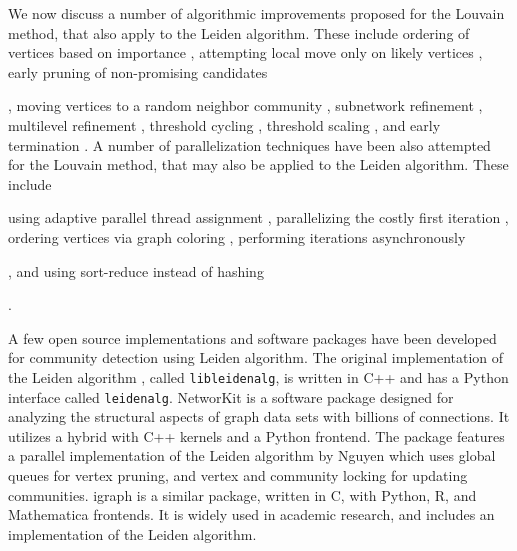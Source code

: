 We now discuss a number of algorithmic improvements proposed for the Louvain method, that also apply to the Leiden algorithm. These include ordering of vertices based on importance \cite{com-aldabobi22}, attempting local move only on likely vertices \cite{com-ryu16, com-ozaki16, com-zhang21, com-shi21}, early pruning of non-promising candidates \cite{com-ryu16, com-halappanavar17, com-zhang21, com-you22}, moving vertices to a random neighbor community \cite{com-traag15}, subnetwork refinement \cite{com-waltman13, com-traag19}, multilevel refinement \cite{com-rotta11, com-gach14, com-shi21}, threshold cycling \cite{com-ghosh18}, threshold scaling \cite{com-lu15, com-naim17, com-halappanavar17}, and early termination \cite{com-ghosh18}. A number of parallelization techniques have been also attempted for the Louvain method, that may also be applied to the Leiden algorithm. These include using adaptive parallel thread assignment \cite{com-fazlali17, com-naim17, com-sattar19, com-mohammadi20}, parallelizing the costly first iteration \cite{com-wickramaarachchi14}, ordering vertices via graph coloring \cite{com-halappanavar17}, performing iterations asynchronously \cite{com-que15, com-shi21}, and using sort-reduce instead of hashing \cite{com-cheong13}.

A few open source implementations and software packages have been developed for community detection using Leiden algorithm. The original implementation of the Leiden algorithm \cite{com-traag19}, called \texttt{libleidenalg}, is written in C++ and has a Python interface called \texttt{leidenalg}. NetworKit \cite{staudt2016networkit} is a software package designed for analyzing the structural aspects of graph data sets with billions of connections. It utilizes a hybrid with C++ kernels and a Python frontend. The package features a parallel implementation of the Leiden algorithm by Nguyen \cite{nguyenleiden} which uses global queues for vertex pruning, and vertex and community locking for updating communities. igraph \cite{csardi2006igraph} is a similar package, written in C, with Python, R, and Mathematica frontends. It is widely used in academic research, and includes an implementation of the Leiden algorithm.
